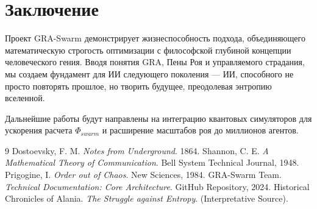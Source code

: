 \documentclass[12pt, a4paper]{article}
\begin{document}
\section{Заключение}

Проект GRA-Swarm демонстрирует жизнеспособность подхода, объединяющего математическую строгость оптимизации с философской глубиной концепции человеческого гения. Вводя понятия GRA, Пены Роя и управляемого страдания, мы создаем фундамент для ИИ следующего поколения — ИИ, способного не просто повторять прошлое, но творить будущее, преодолевая энтропию вселенной.

Дальнейшие работы будут направлены на интеграцию квантовых симуляторов для ускорения расчета $\Phi_{swarm}$ и расширение масштабов роя до миллионов агентов.

\begin{thebibliography}{9}
 Dostoevsky, F. M. \textit{Notes from Underground}. 1864.
 Shannon, C. E. \textit{A Mathematical Theory of Communication}. Bell System Technical Journal, 1948.
 Prigogine, I. \textit{Order out of Chaos}. New Sciences, 1984.
 GRA-Swarm Team. \textit{Technical Documentation: Core Architecture}. GitHub Repository, 2024.
 Historical Chronicles of Alania. \textit{The Struggle against Entropy}. (Interpretative Source).
\end{thebibliography}
\end{document}
